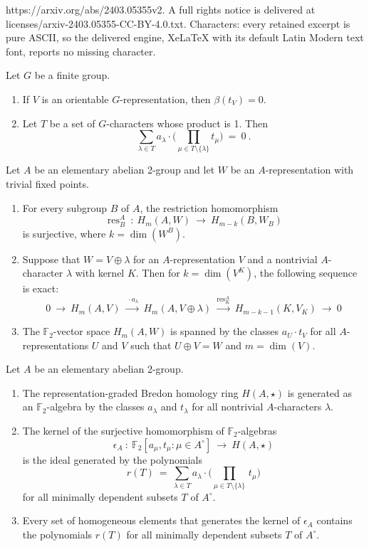 \documentclass[10pt,a4paper]{amsart}
\DeclareMathOperator{\res}{res}
\newcommand{\mF}{{\mathbb F}}
\newcommand{\xra}{\xrightarrow}
\renewcommand{\to}{\longrightarrow}
\begin{document}
https://arxiv.org/abs/2403.05355v2. A full rights notice is delivered at licenses/arxiv-2403.05355-CC-BY-4.0.txt. Characters: every retained excerpt is pure ASCII, so the delivered engine, XeLaTeX with its default Latin Modern text font, reports no missing character.
\begin{prop}\label{prop:x-relation}
  Let $G$ be a finite group.
  \begin{enumerate}[\em (i)]
  \item If $V$ is an orientable $G$-representation, then $\beta(t_V)=0$.
  \item Let $T$ be a set of $G$-characters whose product is 1. Then
    \[
      \sum_{\lambda\in T} a_\lambda \cdot \bigg( \prod_{\mu\in T\setminus\{\lambda\}} t_\mu\bigg)
      \ = \ 0\ .\]
\end{enumerate}
\end{prop}

\begin{prop}\label{prop:fundamental}
  Let $A$ be an elementary abelian 2-group and let $W$ be an $A$-representation
  with trivial fixed points.
  \begin{enumerate}[\em (i)]
\item For every subgroup $B$ of $A$, the restriction homomorphism
  \[ \res^A_B\ : \ H_m(A,W)\ \to \ H_{m-k}(B,W_B) \]
  is surjective, where $k=\dim(W^B)$.
\item 
  Suppose that $W=V\oplus\lambda$ for an $A$-representation $V$ and
  a nontrivial $A$-character $\lambda$ with kernel $K$.
  Then for $k=\dim(V^K)$, the following sequence is exact: 
  \[ 0 \ \to \ H_m(A,V)\ \xra{\ \cdot a_\lambda} \ H_m(A,V\oplus\lambda)\ \xra{\res^A_K} \
    H_{m-k-1}(K,V_K)\ \to\ 0  \]

  \item The  $\mF_2$-vector space $H_m(A,W)$ is spanned by the classes $a_U\cdot t_V$
  for all $A$-representations $U$ and $V$ such that $U\oplus V= W$
  and $m=\dim(V)$.
\end{enumerate}
\end{prop}

\begin{theorem}\label{thm:Bredon_RO-graded}
  Let $A$ be an elementary abelian 2-group.
  \begin{enumerate}[\em (i)]
  \item
    The representation-graded Bredon homology ring $H(A,\star)$
    is generated as an $\mF_2$-algebra
    by the classes $a_\lambda$ and $t_\lambda$ for all nontrivial $A$-characters $\lambda$.
\item 
  The kernel of the surjective homomorphism of $\mF_2$-algebras
  \[ \epsilon_A \ : \  \mF_2[a_\mu,t_\mu\colon \mu\in A^\circ] \ \to \ H(A,\star) \]
  is the ideal generated by the polynomials
  \[  r(T)\ = \
    \sum_{\lambda\in T}  a_\lambda \cdot\bigg( \prod_{\mu\in T\setminus\{\lambda\}}\, t_\mu\bigg) \]
  for all minimally dependent subsets $T$ of $A^\circ$.
\item
  Every set of homogeneous elements that generates the kernel
  of $\epsilon_A$ contains the polynomials $r(T)$
 for all minimally dependent subsets $T$ of $A^\circ$.
\end{enumerate}
\end{theorem}
\end{document}
